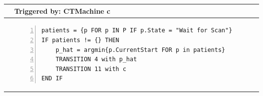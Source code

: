 \begin{tabular}{@{}>{\raggedright\arraybackslash}p{0.25cm}>{\raggedright\arraybackslash}p{13cm}@{}}
  \toprule
   & Triggered by: CTMachine c\\ \midrule 
  &
\vspace{-12pt}
\begin{Verbatim}[numbers=left]
patients = {p FOR p IN P IF p.State = "Wait for Scan"}
IF patients != {} THEN 
    p_hat = argmin{p.CurrentStart FOR p in patients}
    TRANSITION 4 with p_hat
    TRANSITION 11 with c
END IF
  \end{Verbatim}
  \\ \bottomrule
  \end{tabular}